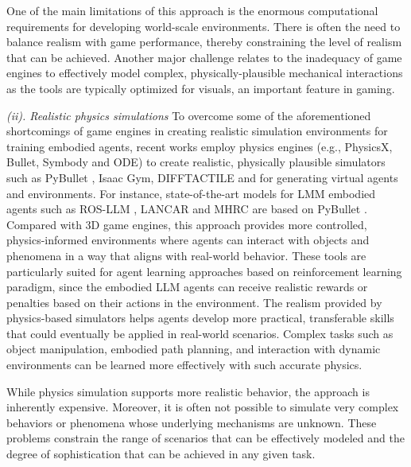 \documentclass[10pt,journal,compsoc]{IEEEtran}
\begin{document}
	
	
	One of the main limitations of this approach is the enormous computational requirements for developing world-scale environments. There is often the need to balance realism with game performance, thereby constraining the level of realism that can be achieved. Another major challenge relates to the inadequacy of game engines to effectively model complex, physically-plausible mechanical interactions as the tools are typically optimized for visuals, an important feature in gaming. 
	
	\textit{(ii). Realistic physics simulations}
	To overcome some of the aforementioned shortcomings of game engines in creating realistic simulation environments for training embodied agents, recent works employ physics engines (e.g., PhysicsX, Bullet, Symbody and ODE) \cite{kaup2024review} to create realistic, physically plausible simulators such as PyBullet \cite{coumans2016pybullet}, Isaac Gym\cite{makoviychuk2021isaac}, DIFFTACTILE \cite{si2024difftactile} and for generating virtual agents and environments. For instance, state-of-the-art models for LMM embodied agents such as ROS-LLM \cite{mower2024ros}, LANCAR \cite{shek2023lancar} and MHRC \cite{yu2024mhrc} are based on PyBullet \cite{coumans2016pybullet}. Compared with 3D game engines, this approach provides more controlled, physics-informed environments where agents can interact with objects and phenomena in a way that aligns with real-world behavior. These tools are particularly suited for agent learning approaches based on reinforcement learning paradigm, since the embodied LLM agents can receive realistic rewards or penalties based on their actions in the environment. The realism provided by physics-based simulators helps agents develop more practical, transferable skills that could eventually be applied in real-world scenarios. Complex tasks such as object manipulation, embodied path planning, and interaction with dynamic environments can be learned more effectively with such accurate physics. 
	
	While physics simulation supports more realistic behavior, the approach is inherently expensive. Moreover, it is often not possible to simulate very complex behaviors or phenomena whose underlying mechanisms are unknown. These problems constrain the range of scenarios that can be effectively modeled and the degree of sophistication that can be achieved in any given task.
	
\end{document}
